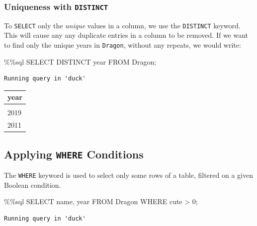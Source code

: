 \documentclass[
  letterpaper,
  DIV=11,
  numbers=noendperiod]{scrreprt}
\newenvironment{Shaded}{\begin{snugshade}}{\end{snugshade}}
\newcommand{\DecValTok}[1]{\textcolor[rgb]{0.68,0.00,0.00}{#1}}
\newcommand{\NormalTok}[1]{\textcolor[rgb]{0.00,0.23,0.31}{#1}}
\newcommand{\OperatorTok}[1]{\textcolor[rgb]{0.37,0.37,0.37}{#1}}
\begin{document}
\subsubsection{\texorpdfstring{Uniqueness with
\texttt{DISTINCT}}{Uniqueness with DISTINCT}}\label{uniqueness-with-distinct}

To \texttt{SELECT} only the \emph{unique} values in a column, we use the
\texttt{DISTINCT} keyword. This will cause any any duplicate entries in
a column to be removed. If we want to find only the unique years in
\texttt{Dragon}, without any repeats, we would write:

\begin{Shaded}
\begin{Highlighting}[]
\OperatorTok{\%\%}\NormalTok{sql}
\NormalTok{SELECT DISTINCT year}
\NormalTok{FROM Dragon}\OperatorTok{;}
\end{Highlighting}
\end{Shaded}

\begin{verbatim}
Running query in 'duck'
\end{verbatim}

\begin{longtable}[]{@{}l@{}}
\toprule\noalign{}
year \\
\midrule\noalign{}
\endhead
\bottomrule\noalign{}
\endlastfoot
2010 \\
2019 \\
2011 \\
\end{longtable}

\subsection{\texorpdfstring{Applying \texttt{WHERE}
Conditions}{Applying WHERE Conditions}}\label{applying-where-conditions}

The \texttt{WHERE} keyword is used to select only some rows of a table,
filtered on a given Boolean condition.

\begin{Shaded}
\begin{Highlighting}[]
\OperatorTok{\%\%}\NormalTok{sql}
\NormalTok{SELECT name, year}
\NormalTok{FROM Dragon}
\NormalTok{WHERE cute }\OperatorTok{\textgreater{}} \DecValTok{0}\OperatorTok{;}
\end{Highlighting}
\end{Shaded}

\begin{verbatim}
Running query in 'duck'
\end{verbatim}
\end{document}

